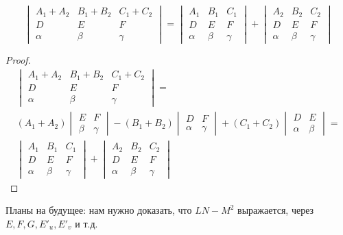 \documentclass[main]{subfiles}
\begin{document}
\begin{lemma}
    \[\begin{vmatrix}
            A_1 + A_2 & B_1 + B_2 & C_1 + C_2 \\
            D         & E         & F         \\
            \alpha    & \beta     & \gamma
        \end{vmatrix} =
        \begin{vmatrix}
            A_1    & B_1   & C_1    \\
            D      & E     & F      \\
            \alpha & \beta & \gamma
        \end{vmatrix} +
        \begin{vmatrix}
            A_2    & B_2   & C_2    \\
            D      & E     & F      \\
            \alpha & \beta & \gamma
        \end{vmatrix}\]
\end{lemma}
\begin{proof}
    \begin{multline*}
        \begin{vmatrix}
            A_1 + A_2 & B_1 + B_2 & C_1 + C_2 \\
            D         & E         & F         \\
            \alpha    & \beta     & \gamma
        \end{vmatrix} =\\
        (A_1 + A_2) \begin{vmatrix}
            E     & F      \\
            \beta & \gamma
        \end{vmatrix}
        - (B_1 + B_2) \begin{vmatrix}
            D      & F      \\
            \alpha & \gamma
        \end{vmatrix}
        + (C_1 + C_2) \begin{vmatrix}
            D      & E     \\
            \alpha & \beta
        \end{vmatrix}=\\
        \begin{vmatrix}
            A_1    & B_1   & C_1    \\
            D      & E     & F      \\
            \alpha & \beta & \gamma
        \end{vmatrix} +
        \begin{vmatrix}
            A_2    & B_2   & C_2    \\
            D      & E     & F      \\
            \alpha & \beta & \gamma
        \end{vmatrix}
    \end{multline*}
\end{proof}
Планы на будущее: нам нужно доказать, что $LN- M^2$ выражается, через $E,F,G, E'_u, E'_v$  и т.д.
\end{document}
